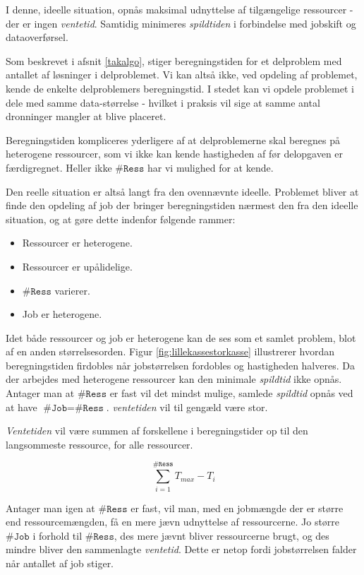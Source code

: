 \documentclass[final,a4paper,11pt]{article}
\begin{document}
I denne, ideelle situation, opnås maksimal udnyttelse af tilgængelige ressourcer - der er ingen \emph{ventetid}. Samtidig minimeres \emph{spildtiden} i forbindelse med jobskift og dataoverførsel.
 
Som beskrevet i afsnit \ref{takalgo}, stiger beregningstiden for et delproblem med antallet af løsninger i delproblemet. Vi kan altså ikke, ved opdeling af problemet, kende de enkelte delproblemers beregningstid. I stedet kan vi opdele problemet i dele med samme data-størrelse - hvilket i praksis vil sige at samme antal dronninger mangler at blive placeret. 

Beregningstiden kompliceres yderligere af at delproblemerne skal beregnes på heterogene ressourcer, som vi ikke kan kende hastigheden af før delopgaven er færdigregnet. Heller ikke $\texttt{\#Ress}$ har vi mulighed for at kende. 

Den reelle situation er altså langt fra den ovennævnte ideelle. Problemet bliver at finde den opdeling af job der bringer beregningstiden nærmest den fra den ideelle situation, og at gøre dette indenfor følgende rammer:
\begin{itemize}
	\item Ressourcer er heterogene.
	\item Ressourcer er upålidelige.
	\item $\texttt{\#Ress}$ varierer.
	\item Job er heterogene.
\end{itemize}

Idet både ressourcer og job er heterogene kan de ses som et samlet problem, blot af en anden størrelsesorden. Figur \ref{fig:lillekassestorkasse} illustrerer hvordan beregningstiden firdobles når jobstørrelsen fordobles og hastigheden halveres.
Da der arbejdes med heterogene ressourcer kan den minimale \emph{spildtid} ikke opnås. 
Antager man at $\texttt{\#Ress}$ er fast vil det mindst mulige, samlede \emph{spildtid} opnås ved at have $\texttt{\#Job} = \texttt{\#Ress}$. \emph{ventetiden} vil til gengæld være stor. 

\emph{Ventetiden} vil være summen af forskellene i beregningstider op til den langsommeste ressource, for alle ressourcer.   
 
\begin{displaymath}
	\sum_{i=1}^{\texttt{\#Ress}} T_{max} - T_{i} 
\end{displaymath}

Antager man igen at $\texttt{\#Ress}$ er fast, vil man, med en jobmængde der er større end ressourcemængden, få en mere jævn udnyttelse af ressourcerne. Jo større $\texttt{\#Job}$ i forhold til $\texttt{\#Ress}$, des mere jævnt bliver ressourcerne brugt, og des mindre bliver den sammenlagte \emph{ventetid}. Dette er netop fordi jobstørrelsen falder når antallet af job stiger. 
\end{document}
